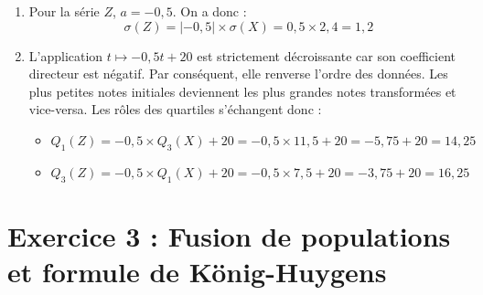 \documentclass[11pt,a4paper]{article}
\begin{document}
\begin{enumerate}
\begin{enumerate}
        \item Pour la série $Z$, $a = -0,5$. On a donc :
        \[ \sigma(Z) = |-0,5| \times \sigma(X) = 0,5 \times 2,4 = 1,2 \]
        
        \item L'application $t \mapsto -0,5t + 20$ est strictement décroissante car son coefficient directeur est négatif. Par conséquent, elle renverse l'ordre des données. Les plus petites notes initiales deviennent les plus grandes notes transformées et vice-versa. Les rôles des quartiles s'échangent donc :
        \begin{itemize}
            \item $Q_1(Z) = -0,5 \times Q_3(X) + 20 = -0,5 \times 11,5 + 20 = -5,75 + 20 = 14,25$
            \item $Q_3(Z) = -0,5 \times Q_1(X) + 20 = -0,5 \times 7,5 + 20 = -3,75 + 20 = 16,25$
        \end{itemize}
    \end{enumerate}
\end{enumerate}

\vspace{0.5cm}

\section*{Exercice 3 : Fusion de populations et formule de König-Huygens}
\end{document}

